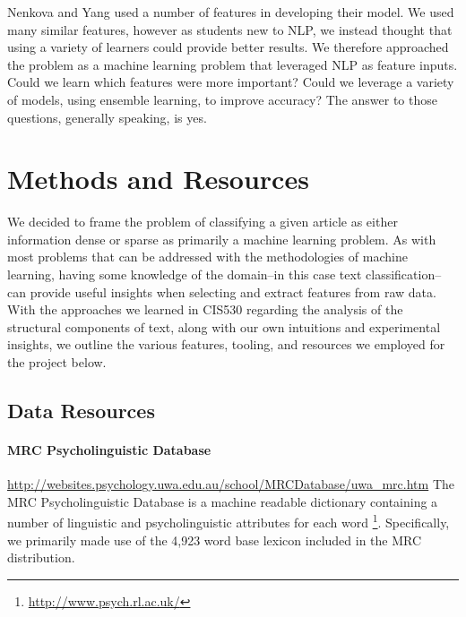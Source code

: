 \documentclass[
10pt, %
a4paper, %
oneside, %
headinclude,footinclude, %
BCOR5mm, %
]{scrartcl}
\begin{document}
Nenkova and Yang used a number of features in developing their model. We used
many similar features, however as students new to NLP, we instead thought that
using a variety of learners could provide better results. We therefore
approached the problem as a machine learning problem that leveraged NLP as
feature inputs. Could we learn which features were more important? Could we
leverage a variety of models, using ensemble learning, to improve accuracy? The
answer to those questions, generally speaking, is yes.

\newpage
 

\section{Methods and Resources}

We decided to frame the problem of classifying a given article as either 
information dense or sparse as primarily a machine learning problem. As with
most problems that can be addressed with the methodologies of machine learning,
having some knowledge of the domain--in this case text classification--can 
provide useful insights when selecting and extract features from raw data. With 
the approaches we learned in CIS530 regarding the analysis of the structural
components of text, along with our own intuitions and experimental 
insights, we outline the various features, tooling, and resources we employed 
for the project below.

\subsection{Data Resources}

\paragraph{\textbf{MRC Psycholinguistic Database}}
\hfill \newline \noindent \url{http://websites.psychology.uwa.edu.au/school/MRCDatabase/uwa_mrc.htm}
\hfill \newline \noindent The MRC Psycholinguistic Database is a machine readable
dictionary containing a number of linguistic and psycholinguistic
attributes for each word \footnote{\url{http://www.psych.rl.ac.uk/}}. 
Specifically, we primarily made use of the 4,923 word base lexicon included in 
the MRC distribution.
\end{document}
